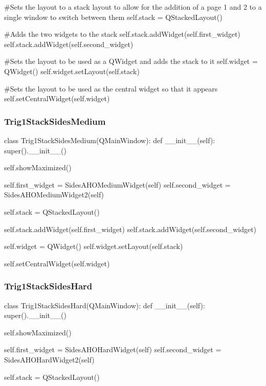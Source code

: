 \begin{landscape}
\begin{python}
        #Sets the layout to a stack layout to allow for the addition of a page 1 and 2 to a single window to switch between them
        self.stack = QStackedLayout()

        #Adds the two widgets to the stack
        self.stack.addWidget(self.first_widget)
        self.stack.addWidget(self.second_widget)

        #Sets the layout to be used as a QWidget and adds the stack to it
        self.widget = QWidget()
        self.widget.setLayout(self.stack)

        #Sets the layout to be used as the central widget so that it appears
        self.setCentralWidget(self.widget)
\end{python}

\subsubsection{Trig1StackSidesMedium}

\begin{python}
class Trig1StackSidesMedium(QMainWindow):
    def __init__(self):
        super().__init__()

        self.showMaximized()

        self.first_widget = SidesAHOMediumWidget(self)
        self.second_widget = SidesAHOMediumWidget2(self)

        self.stack = QStackedLayout()

        self.stack.addWidget(self.first_widget)
        self.stack.addWidget(self.second_widget)

        self.widget = QWidget()
        self.widget.setLayout(self.stack)

        self.setCentralWidget(self.widget)
\end{python}

\subsubsection{Trig1StackSidesHard}

\begin{python}
class Trig1StackSidesHard(QMainWindow):
    def __init__(self):
        super().__init__()

        self.showMaximized()

        self.first_widget = SidesAHOHardWidget(self)
        self.second_widget = SidesAHOHardWidget2(self)

        self.stack = QStackedLayout()


\end{python}
\end{landscape}
